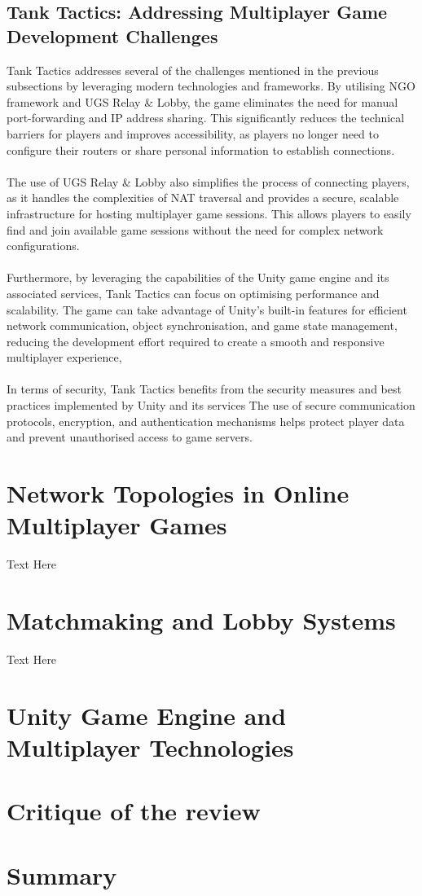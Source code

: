 \subsection{Tank Tactics: Addressing Multiplayer Game Development Challenges}
Tank Tactics addresses several of the challenges mentioned in the previous subsections by leveraging modern technologies and frameworks. By utilising NGO framework and UGS Relay \& Lobby, the game eliminates the need for manual port-forwarding and IP address sharing. This significantly reduces the technical barriers for players and improves accessibility, as players no longer need to configure their routers or share personal information to establish connections.
\\
\noindent
\\
The use of UGS Relay \& Lobby also simplifies the process of connecting players, as it handles the complexities of NAT traversal and provides a secure, scalable infrastructure for hosting multiplayer game sessions. This allows players to easily find and join available game sessions without the need for complex network configurations.
\\
\noindent
\\
Furthermore, by leveraging the capabilities of the Unity game engine and its associated services, Tank Tactics can focus on optimising performance and scalability. The game can take advantage of Unity's built-in features for efficient network communication, object synchronisation, and game state management, reducing the development effort required to create a smooth and responsive multiplayer experience,
\\
\noindent
\\
In terms of security, Tank Tactics benefits from the security measures and best practices implemented by Unity and its services The use of secure communication protocols, encryption, and authentication mechanisms helps protect player data and prevent unauthorised access to game servers.

\section{Network Topologies in Online Multiplayer Games }

Text Here

\section{Matchmaking and Lobby Systems}

Text Here

\section{Unity Game Engine and Multiplayer Technologies}

\section{Critique of the review} %


\section{Summary} 

